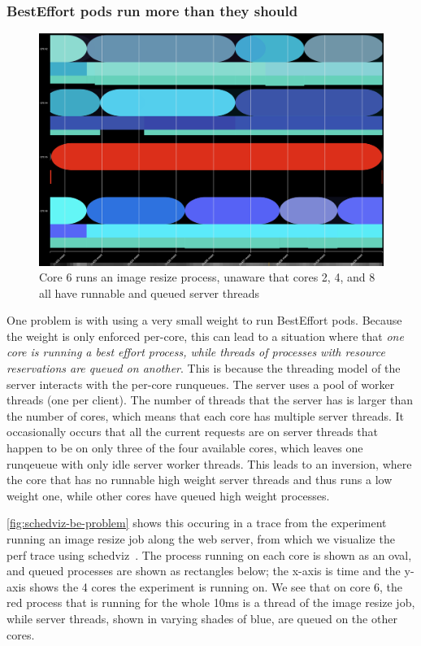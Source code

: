 \subsubsection{BestEffort pods run more than they should}

\begin{figure}[t]
    \centering
    \includegraphics[width=\columnwidth]{graphs/schedviz-be-problem.png}
    \caption{Core 6 runs an image resize process, unaware that cores 2, 4, and 8
    all have runnable and queued server threads}\label{fig:schedviz-be-problem}
\end{figure}

One problem is with using a very small weight to run BestEffort pods. Because
the weight is only enforced per-core, this can lead to a situation where that
\textit{one core is running a best effort process, while threads of processes
with resource reservations are queued on another}. This is because the threading
model of the server interacts with the per-core runqueues. The server uses a
pool of worker threads (one per client). The number of threads that the server
has is larger than the number of cores, which means that each core has multiple
server threads. It occasionally occurs that all the current requests are on
server threads that happen to be on only three of the four available cores,
which leaves one runqeueue with only idle server worker threads. This leads to
an inversion, where the core that has no runnable high weight server threads and
thus runs a low weight one, while other cores have queued high weight processes.

\autoref{fig:schedviz-be-problem} shows this occuring in a trace from the
experiment running an image resize job along the web server, from which we
visualize the perf trace using schedviz~\cite{schedviz-tool}. The process
running on each core is shown as an oval, and queued processes are shown as
rectangles below; the x-axis is time and the y-axis shows the 4 cores the
experiment is running on. We see that on core 6, the red process that is running
for the whole 10ms is a thread of the image resize job, while server threads,
shown in varying shades of blue, are queued on the other cores. 

